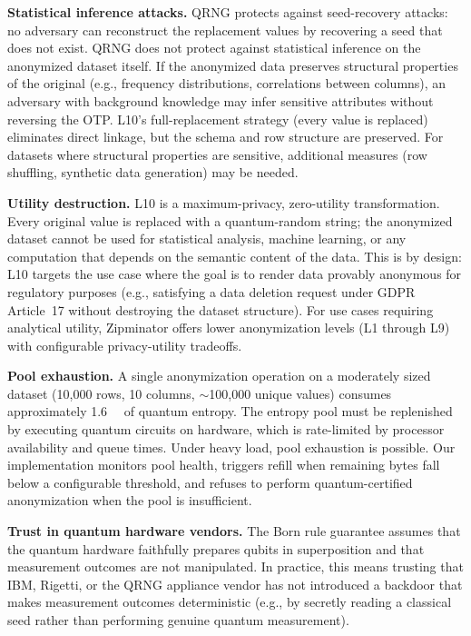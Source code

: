 \documentclass[journal]{IEEEtran}
\begin{document}
\textbf{Statistical inference attacks.} QRNG protects against seed-recovery attacks: no adversary can reconstruct the replacement values by recovering a seed that does not exist. QRNG does not protect against statistical inference on the anonymized dataset itself. If the anonymized data preserves structural properties of the original (e.g., frequency distributions, correlations between columns), an adversary with background knowledge may infer sensitive attributes without reversing the OTP. L10's full-replacement strategy (every value is replaced) eliminates direct linkage, but the schema and row structure are preserved. For datasets where structural properties are sensitive, additional measures (row shuffling, synthetic data generation) may be needed.

\textbf{Utility destruction.} L10 is a maximum-privacy, zero-utility transformation. Every original value is replaced with a quantum-random string; the anonymized dataset cannot be used for statistical analysis, machine learning, or any computation that depends on the semantic content of the data. This is by design: L10 targets the use case where the goal is to render data provably anonymous for regulatory purposes (e.g., satisfying a data deletion request under GDPR Article~17 without destroying the dataset structure). For use cases requiring analytical utility, Zipminator offers lower anonymization levels (L1 through L9) with configurable privacy-utility tradeoffs.

\textbf{Pool exhaustion.} A single anonymization operation on a moderately sized dataset (10,000 rows, 10 columns, ${\sim}$100,000 unique values) consumes approximately \SI{1.6}{\mega\byte} of quantum entropy. The entropy pool must be replenished by executing quantum circuits on hardware, which is rate-limited by processor availability and queue times. Under heavy load, pool exhaustion is possible. Our implementation monitors pool health, triggers refill when remaining bytes fall below a configurable threshold, and refuses to perform quantum-certified anonymization when the pool is insufficient.

\textbf{Trust in quantum hardware vendors.} The Born rule guarantee assumes that the quantum hardware faithfully prepares qubits in superposition and that measurement outcomes are not manipulated. In practice, this means trusting that IBM, Rigetti, or the QRNG appliance vendor has not introduced a backdoor that makes measurement outcomes deterministic (e.g., by secretly reading a classical seed rather than performing genuine quantum measurement).
\end{document}
